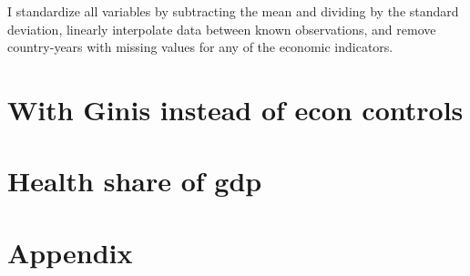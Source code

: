 \documentclass[12pt]{article}
\begin{document}
    I standardize all variables by subtracting the mean and dividing by the standard deviation, linearly interpolate data between known observations, and remove country-years with missing values for any of the economic indicators.

    





    \newpage \clearpage

    \section*{With Ginis instead of econ controls}

    

    \newpage \clearpage

    \section*{Health share of gdp}

    

    \clearpage \newpage

    \appendix

    \section*{Appendix}
\end{document}
